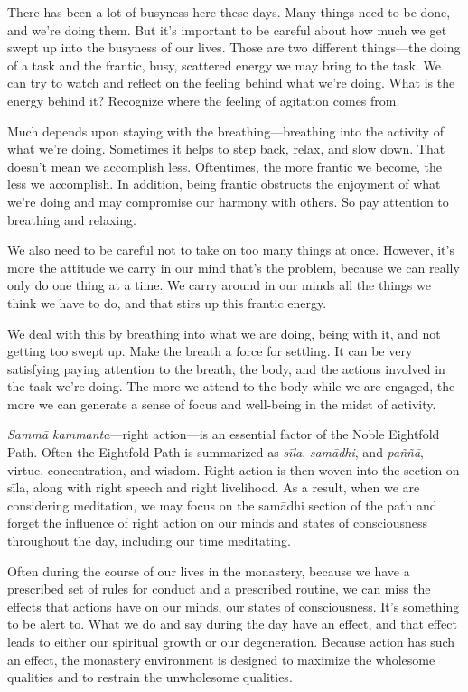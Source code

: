 
There has been a lot of busyness here these days. Many things need to 
be done, and we're doing them. But it's important to be careful about 
how much we get swept up into the busyness of our lives. Those are two 
different things---the doing of a task and the frantic, busy, scattered 
energy we may bring to the task. We can try to watch and reflect on the 
feeling behind what we're doing. What is the energy behind it? 
Recognize where the feeling of agitation comes from.

Much depends upon staying with the breathing---breathing into the 
activity of what we're doing. Sometimes it helps to step back, relax, 
and slow down. That doesn't mean we accomplish less. Oftentimes, the 
more frantic we become, the less we accomplish. In addition, being 
frantic obstructs the enjoyment of what we're doing and may compromise 
our harmony with others. So pay attention to breathing and relaxing.

We also need to be careful not to take on too many things at once. 
However, it's more the attitude we carry in our mind that's the 
problem, because we can really only do one thing at a time. We carry 
around in our minds all the things we think we have to do, and that 
stirs up this frantic energy.

We deal with this by breathing into what we are doing, being with it, 
and not getting too swept up. Make the breath a force for settling. It 
can be very satisfying paying attention to the breath, the body, and 
the actions involved in the task we're doing. The more we attend to the 
body while we are engaged, the more we can generate a sense of focus 
and well-being in the midst of activity.


\emph{Sammā kammanta}---right action---is an essential factor of the 
Noble Eightfold Path. Often the Eightfold Path is summarized as 
\emph{sīla}, \emph{samādhi}, and \emph{paññā}, virtue, 
concentration, and wisdom. Right action is then woven into the section 
on sīla, along with right speech and right livelihood. As a result, 
when we are considering meditation, we may focus on the samādhi 
section of the path and forget the influence of right action on our 
minds and states of consciousness throughout the day, including our 
time meditating.

Often during the course of our lives in the monastery, because we have 
a prescribed set of rules for conduct and a prescribed routine, we can 
miss the effects that actions have on our minds, our states of 
consciousness. It's something to be alert to. What we do and say during 
the day have an effect, and that effect leads to either our spiritual 
growth or our degeneration. Because action has such an effect, the 
monastery environment is designed to maximize the wholesome qualities 
and to restrain the unwholesome qualities.

